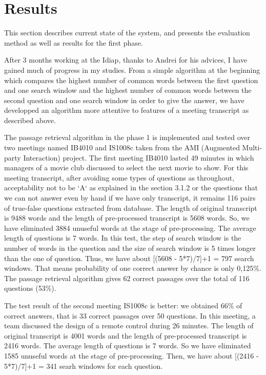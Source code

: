 \documentclass[12pt, a4paper]{report}
\begin{document}
\newpage
\chapter{Results}
This section describes current state of the system, and presents the evaluation method as well as results for the first phase.

After 3 months working at the Idiap, thanks to Andrei for his advices, I have gained much of progress in my studies. From a simple algorithm at the beginning which compares the highest number of common words between the first question and one search window and the highest number of common words between the second question and one search window in order to give the answer, we have developped an algorithm more attentive to features of a meeting transcript as described above.

The passage retrieval algorithm in the phase 1 is implemented and tested over two meetings named IB4010 and IS1008c taken from the AMI (Augmented Multi-party Interaction) project. The first meeting IB4010 lasted 49 minutes in which managers of a movie club discussed to select the next movie to show. For this meeting transcript, after avoiding some types of questions as throughout, acceptability not to be `A` as explained in the section 3.1.2 or the questions that we can not answer even by hand if we have only transcript, it remains 116 pairs of true-false questions extracted from database. The length of original transcript is 9488 words and the length of pre-processed transcript is 5608 words. So, we have eliminated 3884 unuseful words at the stage of pre-processing. The average length of questions is 7 words. In this test, the step of search window is the number of words in the question and the size of search window is 5 times longer than the one of question. Thus, we have about [(5608 - 5*7)/7]+1 = 797 search windows. That means probability of one correct answer by chance is only 0,125\%. The passage retrieval algorithm gives 62 correct passages over the total of 116 questions (53\%).   

The test result of the second meeting IS1008c is better: we obtained 66\% of correct answers, that is 33 correct passages over 50 questions. In this meeting, a team discussed the design of a remote control during 26 minutes. The length of original transcript is 4001 words and the length of pre-processed transcript is 2416 words. The average length of questions is 7 words. So we have eliminated 1585 unuseful words at the stage of pre-processing. Then, we have about [(2416 - 5*7)/7]+1 = 341 searh windows for each question.
\end{document}
